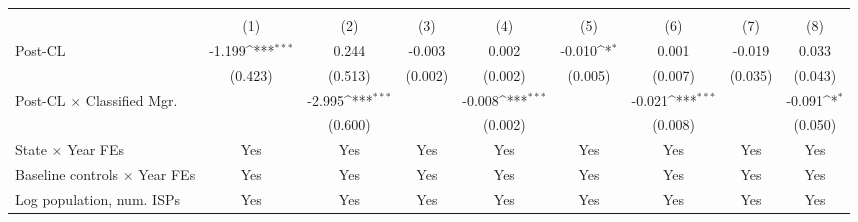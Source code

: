 {
\def\sym#1{\ifmmode^{#1}\else\(^{#1}\)\fi}
\begin{tabular}{l*{8}{c}}
\toprule
                    &&&&\\\cmidrule(lr){2-3}\cmidrule(lr){4-5}\cmidrule(lr){6-7}\cmidrule(lr){8-9}
                    &         &         &         &         &         &         &         &         \\
\midrule
Post-CL             &      -1.199\sym{***}&       0.244         &      -0.003         &       0.002         &      -0.010\sym{*}  &       0.001         &      -0.019         &       0.033         \\
                    &     (0.423)         &     (0.513)         &     (0.002)         &     (0.002)         &     (0.005)         &     (0.007)         &     (0.035)         &     (0.043)         \\
\addlinespace
Post-CL $\times$ Classified Mgr.&                     &      -2.995\sym{***}&                     &      -0.008\sym{***}&                     &      -0.021\sym{***}&                     &      -0.091\sym{*}  \\
                    &                     &     (0.600)         &                     &     (0.002)         &                     &     (0.008)         &                     &     (0.050)         \\
\addlinespace
State $\times$ Year FEs &         Yes         &         Yes         &         Yes         &         Yes         &         Yes         &         Yes         &         Yes         &         Yes         \\
\addlinespace
Baseline controls $\times$ Year FEs &         Yes         &         Yes         &         Yes         &         Yes         &         Yes         &         Yes         &         Yes         &         Yes         \\
\addlinespace
Log population, num. ISPs &         Yes         &         Yes         &         Yes         &         Yes         &         Yes         &         Yes         &         Yes         &         Yes         \\

\end{tabular}}
